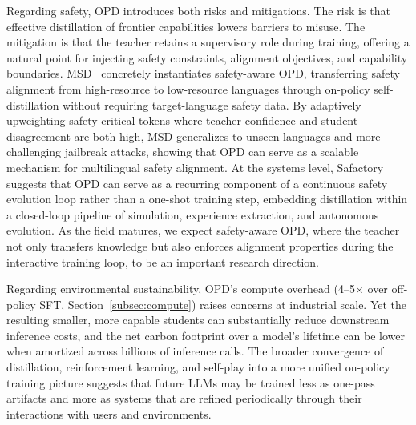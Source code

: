 \documentclass{article} %
\begin{document}
Regarding safety, OPD introduces both risks and mitigations. The risk is that effective distillation of frontier capabilities lowers barriers to misuse. The mitigation is that the teacher retains a supervisory role during training, offering a natural point for injecting safety constraints, alignment objectives, and capability boundaries. MSD~\citep{2605.02971} concretely instantiates safety-aware OPD, transferring safety alignment from high-resource to low-resource languages through on-policy self-distillation without requiring target-language safety data. By adaptively upweighting safety-critical tokens where teacher confidence and student disagreement are both high, MSD generalizes to unseen languages and more challenging jailbreak attacks, showing that OPD can serve as a scalable mechanism for multilingual safety alignment. At the systems level, Safactory~\citep{2605.06230} suggests that OPD can serve as a recurring component of a continuous safety evolution loop rather than a one-shot training step, embedding distillation within a closed-loop pipeline of simulation, experience extraction, and autonomous evolution. As the field matures, we expect safety-aware OPD, where the teacher not only transfers knowledge but also enforces alignment properties during the interactive training loop, to be an important research direction.

Regarding environmental sustainability, OPD's compute overhead (4--5$\times$ over off-policy SFT, Section~\ref{subsec:compute}) raises concerns at industrial scale. Yet the resulting smaller, more capable students can substantially reduce downstream inference costs, and the net carbon footprint over a model's lifetime can be lower when amortized across billions of inference calls. The broader convergence of distillation, reinforcement learning, and self-play into a more unified on-policy training picture suggests that future LLMs may be trained less as one-pass artifacts and more as systems that are refined periodically through their interactions with users and environments.



\end{document}
